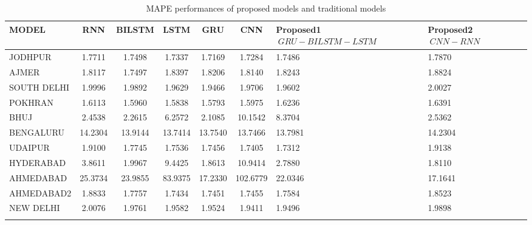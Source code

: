 \documentclass[a4paper,fleqn]{cas-sc}
\begin{document}
\begin{table}[!ht]
\centering
\caption{MAPE performances of proposed models  and traditional models}
\begin{tabular}{|l|c|c|c|c|c|p{}|p{}|}
\hline
\textbf{MODEL} & \textbf{RNN} & \textbf{BILSTM} & \textbf{LSTM} & \textbf{GRU} & \textbf{CNN} &\textbf{Proposed1 \(\ GRU-BILSTM-LSTM \)\ } & \textbf{Proposed2 \(\ CNN-RNN\)\ } \\ \hline
JODHPUR & 1.7711 & 1.7498 & 1.7337 & 1.7169 & 1.7284 & 1.7486 & 1.7870 \\ \hline
AJMER & 1.8117 & 1.7497 & 1.8397 & 1.8206 & 1.8140 & 1.8243 & 1.8824 \\ \hline
SOUTH DELHI & 1.9996 & 1.9892 & 1.9629 & 1.9466 & 1.9706 & 1.9602 & 2.0027 \\ \hline
POKHRAN & 1.6113 & 1.5960 & 1.5838 & 1.5793 & 1.5975 & 1.6236 & 1.6391 \\ \hline
BHUJ & 2.4538 & 2.2615 & 6.2572 & 2.1085 & 10.1542 & 8.3704 & 2.5362 \\ \hline
BENGALURU & 14.2304 & 13.9144 & 13.7414 & 13.7540 & 13.7466 & 13.7981 & 14.2304 \\ \hline
UDAIPUR & 1.9100 & 1.7745 & 1.7536 & 1.7456 & 1.7405 & 1.7312 & 1.9138 \\ \hline
HYDERABAD & 3.8611 & 1.9967 & 9.4425 & 1.8613 & 10.9414 & 2.7880 & 1.8110 \\ \hline
AHMEDABAD & 25.3734 & 23.9855 & 83.9375 & 17.2330 & 102.6779 & 22.0346 & 17.1641 \\ \hline
AHMEDABAD2 & 1.8833 & 1.7757 & 1.7434 & 1.7451 & 1.7455 & 1.7584 & 1.8523 \\ \hline
NEW DELHI & 2.0076 & 1.9761 & 1.9582 & 1.9524 & 1.9411 & 1.9496 & 1.9898 \\ \hline
\label{MAPE}
\end{tabular}
\end{table}
\end{document}
